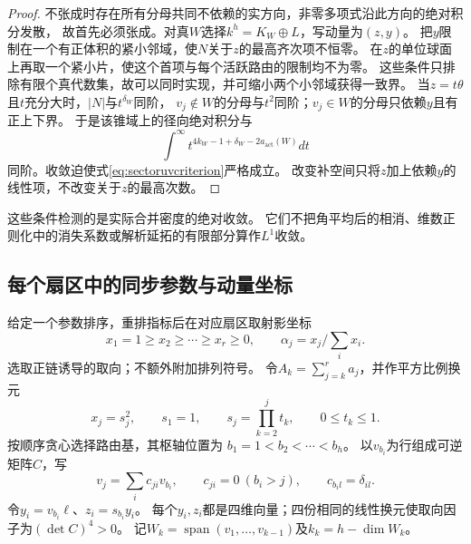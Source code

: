 \documentclass[11pt,a4paper]{ctexart}
\theoremstyle{cnplain}\newtheorem{theorem}{定理}[section]
\theoremstyle{definition}\newtheorem{definition}[theorem]{定义}
\theoremstyle{remark}\newtheorem{remark}[theorem]{注}
\begin{document}
\begin{proof}
不张成时存在所有分母共同不依赖的实方向，非零多项式沿此方向的绝对积分发散，
故首先必须张成。对真$W$选择$k^h=K_W\oplus L$，写动量为$(z,y)$。
把$y$限制在一个有正体积的紧小邻域，使$N$关于$z$的最高齐次项不恒零。
在$z$的单位球面上再取一个紧小片，使这个首项与每个活跃路由的限制均不为零。
这些条件只排除有限个真代数集，故可以同时实现，并可缩小两个小邻域获得一致界。
当$z=t\theta$且$t$充分大时，$|N|$与$t^{\delta_W}$同阶，
$v_j\notin W$的分母与$t^2$同阶；$v_j\in W$的分母只依赖$y$且有正上下界。
于是该锥域上的径向绝对积分与
\[
 \int^{\infty}t^{4k_W-1+\delta_W-2a_{\mathrm{act}}(W)}dt
\]
同阶。收敛迫使式\eqref{eq:sectoruvcriterion}严格成立。
改变补空间只将$z$加上依赖$y$的线性项，不改变关于$z$的最高次数。
\end{proof}

这些条件检测的是实际合并密度的绝对收敛。
它们不把角平均后的相消、维数正则化中的消失系数或解析延拓的有限部分算作$L^1$收敛。

\subsection{每个扇区中的同步参数与动量坐标}

给定一个参数排序，重排指标后在对应扇区取射影坐标
\[
 x_1=1\geq x_2\geq\cdots\geq x_r\geq0,
 \qquad \alpha_j=x_j/\sum_i x_i.
\]
选取正链诱导的取向；不额外附加排列符号。
令$A_k=\sum_{j=k}^r a_j$，并作平方比例换元
\begin{equation}
 x_j=s_j^2,\qquad s_1=1,\qquad
 s_j=\prod_{k=2}^j t_k,\qquad 0\leq t_k\leq1.
 \label{eq:sectorsquarecoords}
\end{equation}
按顺序贪心选择路由基，其枢轴位置为
$b_1=1<b_2<\cdots<b_h$。
以$v_{b_i}$为行组成可逆矩阵$C$，写
\[
 v_j=\sum_i c_{ji}v_{b_i},\qquad
 c_{ji}=0\ (b_i>j),\qquad c_{b_i l}=\delta_{il}.
\]
令$y_i=v_{b_i}\ell$、$z_i=s_{b_i}y_i$。
每个$y_i,z_i$都是四维向量；四份相同的线性换元使取向因子为$(\det C)^4>0$。
记$W_k=\operatorname{span}(v_1,\ldots,v_{k-1})$及$k_k=h-\dim W_k$。
\end{document}
